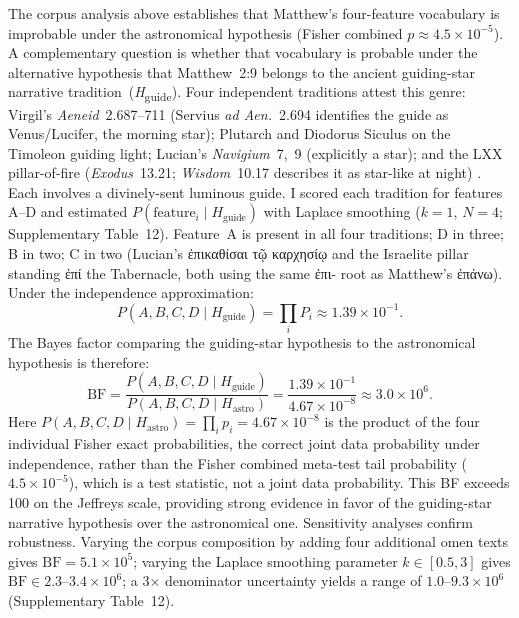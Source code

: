 \documentclass[sn-nature]{sn-jnl}
\newcommand{\grk}[1]{{\fontencoding{LGR}\selectfont #1}}
\newcommand{\grk}[1]{{\greekfont #1}}
\begin{document}
The corpus analysis above establishes that Matthew's four-feature vocabulary
is improbable under the astronomical hypothesis (Fisher combined $p \approx 4.5\times10^{-5}$).
A complementary question is whether that vocabulary is probable under the
alternative hypothesis that Matthew~2:9 belongs to the ancient guiding-star
narrative tradition~(\textit{H}\textsubscript{guide}). Four independent traditions
attest this genre: Virgil's \textit{Aeneid}~2.687--711 (Servius \textit{ad
Aen.}~2.694 identifies the guide as Venus/Lucifer, the morning star); Plutarch
and Diodorus Siculus on the Timoleon guiding light; Lucian's
\textit{Navigium}~7,~9 (explicitly a star); and the LXX pillar-of-fire
(\textit{Exodus}~13.21; \textit{Wisdom}~10.17 describes it as star-like at night) 
\cite{adair2012,adair_jsnt,heilen2015}. Each involves a divinely-sent luminous guide.
I scored each tradition for features A--D and estimated
$P(\text{feature}_i \mid H_\text{guide})$ with Laplace smoothing
($k=1$, $N=4$; Supplementary Table~12).
Feature~A is present in all four traditions; D in three; B in two;
C in two (Lucian's \grk{ἐπικαθίσαι τῷ καρχησίῳ} and the Israelite pillar standing \grk{ἐπί} 
the Tabernacle, both using the same \grk{ἐπι-} root as Matthew's \grk{ἐπάνω}).
Under the independence approximation:
\begin{equation}
  P(A,B,C,D \mid H_\text{guide}) = \prod_{i} P_i \approx 1.39\times10^{-1}.
  \label{eq:pguide}
\end{equation}
The Bayes factor comparing the guiding-star hypothesis to the astronomical
hypothesis is therefore:
\begin{equation}
  \mathrm{BF} = \frac{P(A,B,C,D \mid H_\text{guide})}
                      {P(A,B,C,D \mid H_\text{astro})}
             = \frac{1.39\times10^{-1}}{4.67\times10^{-8}}
             \approx 3.0\times10^{6}.
  \label{eq:bf}
\end{equation}
Here $P(A,B,C,D\mid H_\text{astro}) = \prod_i p_i = 4.67\times10^{-8}$ is
the product of the four individual Fisher exact probabilities, the correct
joint data probability under independence, rather than the Fisher combined
meta-test tail probability ($4.5\times10^{-5}$), which is a test statistic,
not a joint data probability.
This BF exceeds 100 on the Jeffreys scale, providing strong evidence in favor of
the guiding-star narrative hypothesis over the astronomical one. Sensitivity analyses confirm robustness. Varying the corpus composition by
adding four additional omen texts gives $\mathrm{BF} = 5.1\times10^{5}$; varying the
Laplace smoothing parameter $k \in [0.5, 3]$ gives
$\mathrm{BF} \in 2.3$--$3.4\times10^{6}$; a 3$\times$ denominator uncertainty
yields a range of $1.0$--$9.3\times10^{6}$
(Supplementary Table~12).
\end{document}
